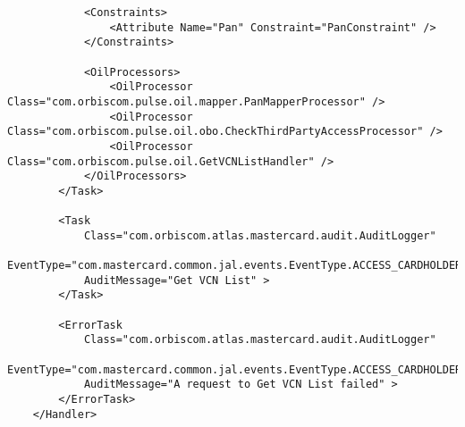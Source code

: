 \documentclass[a4paper,12pt, titlepage]{article}
\begin{document}
\begin{itemize}
\begin{verbatim}
            <Constraints>
                <Attribute Name="Pan" Constraint="PanConstraint" />
            </Constraints>

            <OilProcessors>
                <OilProcessor Class="com.orbiscom.pulse.oil.mapper.PanMapperProcessor" />
                <OilProcessor Class="com.orbiscom.pulse.oil.obo.CheckThirdPartyAccessProcessor" />
                <OilProcessor Class="com.orbiscom.pulse.oil.GetVCNListHandler" />
            </OilProcessors>
        </Task>

        <Task
            Class="com.orbiscom.atlas.mastercard.audit.AuditLogger"
            EventType="com.mastercard.common.jal.events.EventType.ACCESS_CARDHOLDER_DATA"
            AuditMessage="Get VCN List" >
        </Task>
        
        <ErrorTask
            Class="com.orbiscom.atlas.mastercard.audit.AuditLogger"
            EventType="com.mastercard.common.jal.events.EventType.ACCESS_CARDHOLDER_DATA"
            AuditMessage="A request to Get VCN List failed" >
        </ErrorTask>
    </Handler>


\end{verbatim}
\end{itemize}
\end{document}
